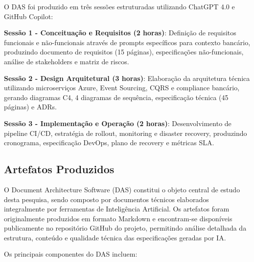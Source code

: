 O DAS foi produzido em três sessões estruturadas utilizando ChatGPT 4.0 e GitHub Copilot:

\textbf{Sessão 1 - Conceituação e Requisitos (2 horas)}: Definição de requisitos funcionais e não-funcionais através de prompts específicos para contexto bancário, produzindo documento de requisitos (15 páginas), especificações não-funcionais, análise de stakeholders e matriz de riscos.

\textbf{Sessão 2 - Design Arquitetural (3 horas)}: Elaboração da arquitetura técnica utilizando microserviços Azure, Event Sourcing, CQRS e compliance bancário, gerando diagramas C4, 4 diagramas de sequência, especificação técnica (45 páginas) e ADRs.

\textbf{Sessão 3 - Implementação e Operação (2 horas)}: Desenvolvimento de pipeline CI/CD, estratégia de rollout, monitoring e disaster recovery, produzindo cronograma, especificação DevOps, plano de recovery e métricas SLA.

\subsection{Artefatos Produzidos}

O Document Architecture Software (DAS) constitui o objeto central de estudo desta pesquisa, sendo composto por documentos técnicos elaborados integralmente por ferramentas de Inteligência Artificial. Os artefatos foram originalmente produzidos em formato Markdown e encontram-se disponíveis publicamente no repositório GitHub do projeto, permitindo análise detalhada da estrutura, conteúdo e qualidade técnica das especificações geradas por IA.

Os principais componentes do DAS incluem:

